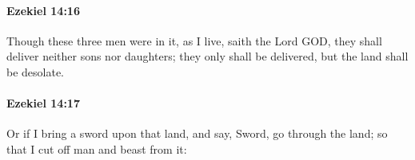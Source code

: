 		\paragraph{Ezekiel 14:16} %
			\label{EZEKIEL-14-16}

			Though these three men were in it, as I live, saith the Lord GOD, they shall deliver neither sons nor daughters; they only shall be delivered, but the land shall be desolate.


		\paragraph{Ezekiel 14:17} %
			\label{EZEKIEL-14-17}

			Or if I bring a sword upon that land, and say, Sword, go through the land; so that I cut off man and beast from it:


